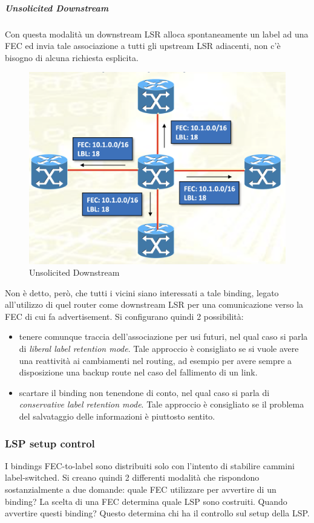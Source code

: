 \documentclass{article}
\begin{document}
\subparagraph{Unsolicited Downstream} Con questa modalità un downstream LSR alloca spontaneamente un label ad una FEC ed invia tale associazione a tutti gli upstream LSR adiacenti, non c'è bisogno di alcuna richiesta esplicita.
\begin{figure}[H]
    \centering
    \includegraphics[scale=0.3]{figures/unsolicited downstream.png}
    \caption{Unsolicited Downstream}
\end{figure}
\noindent Non è detto, però, che tutti i vicini siano interessati a tale binding, legato all'utilizzo di quel router come downstream LSR per una comunicazione verso la FEC di cui fa advertisement. Si configurano quindi 2 possibilità:
\begin{itemize}
    \item tenere comunque traccia dell'associazione per usi futuri, nel qual caso si parla di \textit{liberal label retention mode}. Tale approccio è consigliato se si vuole avere una reattività ai cambiamenti nel routing, ad esempio per avere sempre a disposizione una backup route nel caso del fallimento di un link.
    \item scartare il binding non tenendone di conto, nel qual caso si parla di \textit{conservative label retention mode}. Tale approccio è consigliato se il problema del salvataggio delle informazioni è piuttosto sentito.
\end{itemize}

\subsubsection{LSP setup control} I bindings FEC-to-label sono distribuiti solo con l'intento di stabilire cammini label-switched. Si creano quindi 2 differenti modalità che rispondono sostanzialmente a due domande: quale FEC utilizzare per avvertire di un binding? La scelta di una FEC determina quale LSP sono costruiti. Quando avvertire questi binding? Questo determina chi ha il controllo sul setup della LSP.
\end{document}
